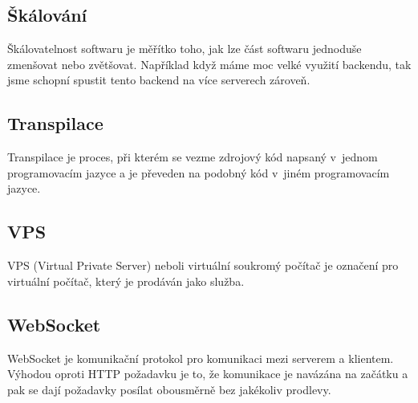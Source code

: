 \subsection{Škálování}
Škálovatelnost softwaru je měřítko toho, jak lze část softwaru jednoduše zmenšovat nebo zvětšovat. \cite{Skalovani} Například když máme moc velké využití backendu, tak jsme schopní spustit tento backend na více serverech zároveň.

\subsection{Transpilace}
Transpilace je proces, při kterém se vezme zdrojový kód napsaný v~jednom programovacím jazyce a je převeden na podobný kód v~jiném programovacím jazyce. \cite{Transpilace}

\subsection{VPS}
VPS (Virtual Private Server) neboli virtuální soukromý počítač je označení pro virtuální počítač, který je prodáván jako služba.

\subsection{WebSocket}
WebSocket je komunikační protokol pro komunikaci mezi serverem a klientem. Výhodou oproti HTTP požadavku je to, že komunikace je navázána na začátku a pak se dají požadavky posílat obousměrně bez jakékoliv prodlevy.
